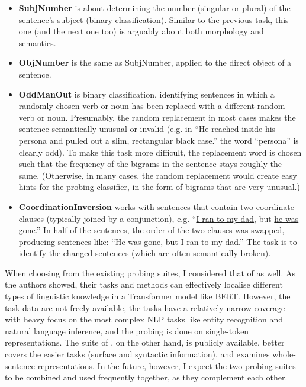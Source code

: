 \documentclass[bsc,frontabs,twoside,singlespacing,parskip,deptreport]{infthesis}
\begin{document}
{{\begin{enumerate}
{\begin{itemize}
          \item \textbf{SubjNumber} is about determining the number (singular or plural) of the sentence's subject (binary classification). Similar to the previous task, this one (and the next one too) is arguably about both morphology and semantics.
          \item \textbf{ObjNumber} is the same as SubjNumber, applied to the direct object of a sentence.
          \item \textbf{OddManOut} is binary classification, identifying sentences in which a randomly chosen verb or noun has been replaced with a different random verb or noun. Presumably, the random replacement in most cases makes the sentence semantically unusual or invalid (e.g. in ``He reached inside his persona and pulled out a slim, rectangular black case.'' the word ``persona'' is clearly odd). To make this task more difficult, the replacement word is chosen such that the frequency of the bigrams in the sentence stays roughly the same. (Otherwise, in many cases, the random replacement would create easy hints for the probing classifier, in the form of bigrams that are very unusual.)
          \item \textbf{CoordinationInversion} works with sentences that contain two coordinate clauses (typically joined by a conjunction), e.g. ``\underline{I ran to my dad}, but \underline{he was gone}.'' In half of the sentences, the order of the two clauses was swapped, producing sentences like: ``\underline{He was gone}, but \underline{I ran to my dad}.'' The task is to identify the changed sentences (which are often semantically broken).
        \end{itemize}
      }
    \end{enumerate}

    When choosing from the existing probing suites, I considered that of \citet{Tenney_2019b} as well. As the authors showed, their tasks and methods can effectively localise different types of linguistic knowledge in a Transformer model like BERT.
    However, the task data are not freely available, the tasks have a relatively narrow coverage with heavy focus on the most complex NLP tasks like entity recognition and natural language inference, and the probing is done on single-token representations.
    The suite of \citeauthor{Conneau_2018}, on the other hand, is publicly available, better covers the easier tasks (surface and syntactic information), and examines whole-sentence representations.
    In the future, however, I expect the two probing suites to be combined and used frequently together, as they complement each other.
  }
}
\end{document}
